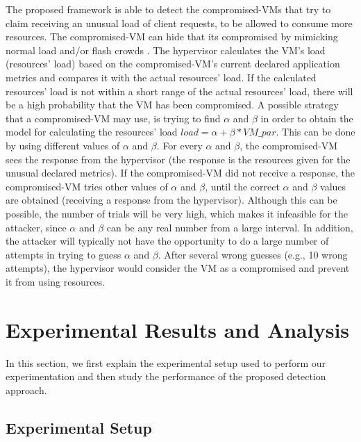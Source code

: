 \documentclass[twocolumn]{bmcart}%
\begin{document}
The proposed framework is able to detect the compromised-VMs that try to claim receiving an unusual load of client requests, to be allowed to consume more resources. The compromised-VM can hide that its compromised by mimicking normal load and/or flash crowds \cite{kandula2005botz}. The hypervisor calculates the VM's load (resources' load) based on the compromised-VM's current declared application metrics and compares it with the actual resources' load. If the calculated resources' load is not within a short range of the actual resources' load, there will be a high probability that the VM has been compromised. A possible strategy that a compromised-VM may use, is trying to find $\alpha$ and $\beta$ in order to obtain the model for calculating the resources' load $load = \alpha + \beta * VM\_par$. This can be done by using different values of $\alpha$ and $\beta$. For every $\alpha$ and $\beta$, the compromised-VM sees the response from the hypervisor (the response is the resources given for the unusual declared metrics). If the compromised-VM did not receive a response, the compromised-VM tries other values of $\alpha$ and $\beta$, until the correct $\alpha$ and $\beta$ values are obtained (receiving a response from the hypervisor). Although this can be possible, the number of trials will be very high, which makes it infeasible for the attacker, since $\alpha$ and $\beta$ can be any real number from a large interval. In addition, the attacker will typically not have the opportunity to do a large number of attempts in trying to guess $\alpha$ and $\beta$. After several wrong guesses (e.g., 10 wrong attempts), the hypervisor would consider the VM as a compromised and prevent it from using resources.

\section*{Experimental Results and Analysis}

In this section, we first explain the experimental setup used to perform our experimentation and then study the performance of the proposed detection approach.

\subsection*{Experimental Setup}
\end{document}
